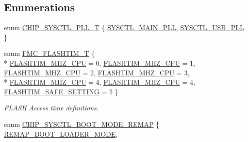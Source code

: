 \subsection*{Enumerations}
\begin{DoxyCompactItemize}
\item 
enum \hyperlink{group__SYSCTL__17XX__40XX_ga5f5478a201b021ed04a0724bff524c4b}{C\-H\-I\-P\-\_\-\-S\-Y\-S\-C\-T\-L\-\_\-\-P\-L\-L\-\_\-\-T} \{ \hyperlink{group__SYSCTL__17XX__40XX_gga5f5478a201b021ed04a0724bff524c4bad3626cb96bb7a84a9bce324812044d21}{S\-Y\-S\-C\-T\-L\-\_\-\-M\-A\-I\-N\-\_\-\-P\-L\-L}, 
\hyperlink{group__SYSCTL__17XX__40XX_gga5f5478a201b021ed04a0724bff524c4ba5ee38509163556b883664d7259c43dfd}{S\-Y\-S\-C\-T\-L\-\_\-\-U\-S\-B\-\_\-\-P\-L\-L}
 \}
\item 
enum \hyperlink{group__SYSCTL__17XX__40XX_ga0779e088e3fa7b3a18e66fa0949da8a7}{F\-M\-C\-\_\-\-F\-L\-A\-S\-H\-T\-I\-M\-\_\-\-T} \{ \\*
\hyperlink{group__SYSCTL__17XX__40XX_gga0779e088e3fa7b3a18e66fa0949da8a7aeb017487ff6fd051dfc885ba063415a3}{F\-L\-A\-S\-H\-T\-I\-M\-\_\-M\-H\-Z\-\_\-\-C\-P\-U} = 0, 
\hyperlink{group__SYSCTL__17XX__40XX_gga0779e088e3fa7b3a18e66fa0949da8a7a617391e132f72d731806d6af10863407}{F\-L\-A\-S\-H\-T\-I\-M\-\_\-M\-H\-Z\-\_\-\-C\-P\-U} = 1, 
\hyperlink{group__SYSCTL__17XX__40XX_gga0779e088e3fa7b3a18e66fa0949da8a7af482ee6a465905fd232ff2da7f993514}{F\-L\-A\-S\-H\-T\-I\-M\-\_\-M\-H\-Z\-\_\-\-C\-P\-U} = 2, 
\hyperlink{group__SYSCTL__17XX__40XX_gga0779e088e3fa7b3a18e66fa0949da8a7aff2c5410ad123adc43eb1a781f71ffe8}{F\-L\-A\-S\-H\-T\-I\-M\-\_\-M\-H\-Z\-\_\-\-C\-P\-U} = 3, 
\\*
\hyperlink{group__SYSCTL__17XX__40XX_gga0779e088e3fa7b3a18e66fa0949da8a7af386ac4dceedf99032479736a40c7257}{F\-L\-A\-S\-H\-T\-I\-M\-\_\-M\-H\-Z\-\_\-\-C\-P\-U} = 4, 
\hyperlink{group__SYSCTL__17XX__40XX_gga0779e088e3fa7b3a18e66fa0949da8a7a747d8440c3924f3546bbb895b101e085}{F\-L\-A\-S\-H\-T\-I\-M\-\_\-M\-H\-Z\-\_\-\-C\-P\-U} = 4, 
\hyperlink{group__SYSCTL__17XX__40XX_gga0779e088e3fa7b3a18e66fa0949da8a7a769f5cbe41f1f487aeaf3ca300be86fb}{F\-L\-A\-S\-H\-T\-I\-M\-\_\-\-S\-A\-F\-E\-\_\-\-S\-E\-T\-T\-I\-N\-G} = 5
 \}
\begin{DoxyCompactList}\small\item\em F\-L\-A\-S\-H Access time definitions. \end{DoxyCompactList}\item 
enum \hyperlink{group__SYSCTL__17XX__40XX_ga08779259bb52e97fa1491aa0047da2c6}{C\-H\-I\-P\-\_\-\-S\-Y\-S\-C\-T\-L\-\_\-\-B\-O\-O\-T\-\_\-\-M\-O\-D\-E\-\_\-\-R\-E\-M\-A\-P} \{ \hyperlink{group__SYSCTL__17XX__40XX_gga08779259bb52e97fa1491aa0047da2c6ac021b05380bf12e261025e5a86ae6fc4}{R\-E\-M\-A\-P\-\_\-\-B\-O\-O\-T\-\_\-\-L\-O\-A\-D\-E\-R\-\_\-\-M\-O\-D\-E}, 

\end{DoxyCompactItemize}
